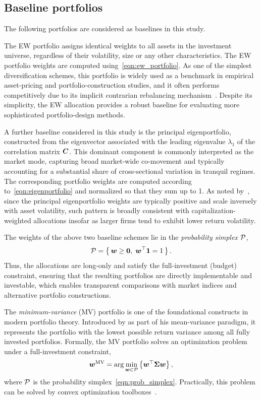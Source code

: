 \documentclass[pdflatex,sn-basic]{sn-jnl}%
\theoremstyle{thmstyleone}%
\theoremstyle{thmstyletwo}%
\theoremstyle{thmstylethree}%
\begin{document}
\subsection{Baseline portfolios}
\label{sec:baselines}
The following portfolios are considered as baselines in this study.

The EW portfolio assigns identical weights to all assets in the investment universe, regardless of their volatility, size or any other characteristics. The EW portfolio weights are computed using~\eqref{eqn:ew_portfolio}. As one of the simplest diversification schemes, this portfolio is widely used as a benchmark in empirical asset-pricing and portfolio-construction studies, and it often performs competitively due to its implicit contrarian rebalancing mechanism~\citep{demiguel2009optimal}. Despite its simplicity, the EW allocation provides a robust baseline for evaluating more sophisticated portfolio-design methods.

A further baseline considered in this study is the principal eigenportfolio, constructed from the eigenvector associated with the leading eigenvalue $\lambda_1$ of the correlation matrix $\boldsymbol{C}$. This dominant component is commonly interpreted as the market mode, capturing broad market-wide co-movement and typically accounting for a substantial share of cross-sectional variation in tranquil regimes. The corresponding portfolio weights are computed according to~\eqref{eqn:eigenportfolio} and normalized so that they sum up to 1. As noted by~\citet{avellaneda2010statistical}, since the principal eigenportfolio weights are typically positive and scale inversely with asset volatility, such pattern is broadly consistent with capitalization-weighted allocations insofar as larger firms tend to exhibit lower return volatility. 

The weights of the above two baseline schemes lie in the \textit{probability simplex} $\mathcal{P}$,
\begin{equation}
\label{eqn:prob_simplex}
    \mathcal{P} = \left\{ \,\boldsymbol{w} \ge \boldsymbol{0},\; \boldsymbol{w}^{\top} \boldsymbol{1} = 1 \, \right\}.
\end{equation}
Thus, the allocations are long-only and satisfy the full-investment (budget) constraint, ensuring that the resulting portfolios are directly implementable and investable, which enables transparent comparisons with market indices and alternative portfolio constructions.

The \textit{minimum-variance} (MV) portfolio is one of the foundational constructs in modern portfolio theory. Introduced by \citet{markowitz1952portfolio} as part of his mean-variance paradigm, it represents the portfolio with the lowest possible return variance among all fully invested portfolios. Formally, the MV portfolio solves an optimization problem under a full-investment constraint,
\begin{equation}
\label{eqn:mv_portfolio}
    \boldsymbol{w}^{\textrm{MV}} = 
    \mathrm{arg}\min_{\boldsymbol{w} \in \mathcal{P}} \left\{ \boldsymbol{w}^\top \boldsymbol{\Sigma} \boldsymbol{w} \right\},
\end{equation}
where $\mathcal{P}$ is the probability simplex~\eqref{eqn:prob_simplex}. Practically, this problem can be solved by convex optimization toolboxes~\citep[see, e.g.,][]{grant2009cvx, mathworks2025quadprog}. 
\end{document}
